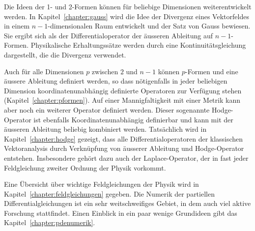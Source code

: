 Die Ideen der 1- und 2-Formen können für beliebige Dimensionen
weiterentwickelt werden.
In Kapitel~\ref{chapter:gauss} wird die Idee der Divergenz eines
Vektorfeldes in einem $n-1$-dimensionalen Raum entwickelt und der
Satz von Gauss bewiesen.
%
Sie ergibt sich als der Differentialoperator der äusseren Ableitung
auf $n-1$-Formen.
Physikalische Erhaltungssätze werden durch eine Kontinuitätsgleichung
%
dargestellt, die die Divergenz verwendet.
%

Auch für alle Dimensionen $p$ zwischen $2$ und $n-1$ können $p$-Formen und
eine äussere Ableitung definiert werden, so dass nötigenfalls 
in jeder beliebigen Dimension koordinatenunabhängig definierte
Operatoren zur Verfügung stehen (Kapitel~\ref{chapter:pformen}).
Auf einer Mannigfaltigkeit mit einer Metrik kann aber noch ein weiterer
Operator definiert werden.
Dieser sogenannte Hodge-Operator ist ebenfalls Koordinatenunabhängig
%
definierbar und kann mit der äusseren Ableitung beliebig kombiniert
werden.
%
Tatsächlich wird in Kapitel~\ref{chapter:hodge} gezeigt, dass alle
Differentialoperatoren der klassischen Vektoranalysis durch Verknüpfung
von äusserer Ableitung und Hodge-Operator entstehen.
Insbesondere gehört dazu auch der Laplace-Operator, der in fast
%
jeder Feldgleichung zweiter Ordnung der Physik vorkommt.

Eine Übersicht über wichtige Feldgleichungen der Physik wird
in Kapitel~\ref{chapter:feldgleichungen} gegeben.
Die Numerik der partiellen Differentialgleichungen ist ein sehr
weitschweifiges Gebiet, in dem auch viel aktive Forschung stattfindet.
Einen Einblick in ein paar wenige Grundideen gibt das
Kapitel~\ref{chapter:pdenumerik}.

